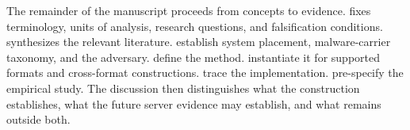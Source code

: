 The remainder of the manuscript proceeds from concepts to evidence.
 fixes terminology, units of analysis, research
questions, and falsification conditions.  synthesizes the
relevant literature.
establish system placement, malware-carrier taxonomy, and the adversary.
define the method.
 instantiate it for supported formats
and cross-format constructions.
 trace the implementation.
pre-specify the empirical study. The discussion then distinguishes what the
construction establishes, what the future server evidence may establish, and
what remains outside both.
